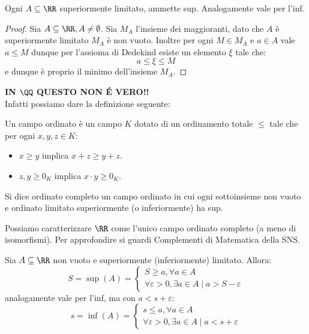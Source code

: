 \documentclass[11pt]{scrartcl}
\begin{document}
	\begin{theorem}[$\RR$ è completo]
		Ogni $A\subseteq\RR$ superiormente limitato, ammette sup. Analogamente vale per l'inf.
	\end{theorem}
	\begin{proof}
		Sia $A\subseteq\RR,A\ne\emptyset$. Sia $M_A$ l'insieme dei maggioranti, dato che $A$ è superiormente limitato $M_A$ è non vuoto. Inoltre per ogni $M\in M_A$ e $a\in A$ vale $a\le M$ dunque per l'assioma di Dedekind esiste un elemento $\xi$ tale che:
		$$a\le \xi \le M$$
		e dunque è proprio il minimo dell'insieme $M_A$.
	\end{proof}
	\textbf{IN $\QQ$ QUESTO NON \'E VERO!!} \\
	Infatti possiamo dare la definizione seguente:
	\begin{definition}
		Un campo ordinato è un campo $K$ dotato di un ordinamento totale $\le$ tale che per ogni $x,y,z\in K$:
		\begin{itemize}
			\item $x\ge y$ implica $x+z\ge y +z$.
			\item $z,y\ge 0_K$ implica $x\cdot y \ge 0_K$.
		\end{itemize}
	\end{definition}
	\begin{definition}
		Si dice ordinato completo un campo ordinato in cui ogni sottoinsieme non vuoto e ordinato limitato superiormente (o inferiormente) ha sup.
	\end{definition}
	Possiamo caratterizzare $\RR$ come l'unico campo ordinato completo (a meno di isomorfismi). Per approfondire si guardi Complementi di Matematica della SNS. 
	\begin{lemma}
		Sia $A\subseteq\RR$ non vuoto e superiormente (inferiormente) limitato. Allora:
		$$S=\sup(A)=
		\begin{cases}
			S\ge a, \forall a\in A \\
			\forall \varepsilon>0,\exists a\in A \mid a>S-\varepsilon
		\end{cases}$$
		analogamente vale per l'inf, ma con $a<s+\varepsilon$:
		$$s=\inf(A)=
		\begin{cases}
			s\le a, \forall a \in A \\
			\forall \varepsilon>0, \exists a \in A \mid a<s+\varepsilon
		\end{cases}$$
	\end{lemma}
\end{document}
